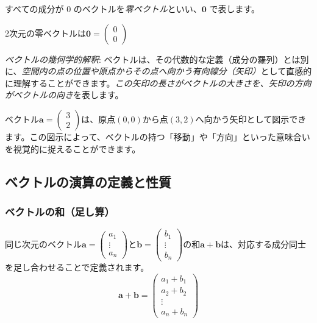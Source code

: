 \begin{dfn}[零ベクトル] \label{vector_zero}
すべての成分が $0$ のベクトルを\emph{零ベクトル}といい、$\bm{0}$ で表します。
\end{dfn}

\begin{ex}
2次元の零ベクトルは$\bm{0} = \begin{pmatrix} 0 \\ 0 \end{pmatrix}$
\end{ex}

\emph{ベクトルの幾何学的解釈}: ベクトルは、その代数的な定義（成分の羅列）とは別に、\emph{空間内の点の位置や原点からその点へ向かう有向線分（矢印）}として直感的に理解することができます。\emph{この矢印の長さがベクトルの大きさを、矢印の方向がベクトルの向き}を表します。

\begin{ex}
ベクトル$\bm{a} = \begin{pmatrix} 3 \\ 2 \end{pmatrix}$は、原点$(0,0)$から点$(3,2)$へ向かう矢印として図示できます。この図示によって、ベクトルの持つ「移動」や「方向」といった意味合いを視覚的に捉えることができます。
\end{ex}

\subsection{ベクトルの演算の定義と性質}

\subsubsection{ベクトルの和（足し算）}

\begin{dfn}[ベクトルの和] \label{vector_sum}
同じ次元のベクトル$\bm{a}=\begin{pmatrix} a_1 \\ \vdots \\ a_n \end{pmatrix}$と$\bm{b}=\begin{pmatrix} b_1 \\ \vdots \\ b_n \end{pmatrix}$の和$\bm{a}+\bm{b}$は、対応する成分同士を足し合わせることで定義されます。
\[\bm{a} + \bm{b} = \begin{pmatrix} a_1 + b_1 \\ a_2 + b_2 \\ \vdots \\ a_n + b_n \end{pmatrix}\]
\end{dfn}

